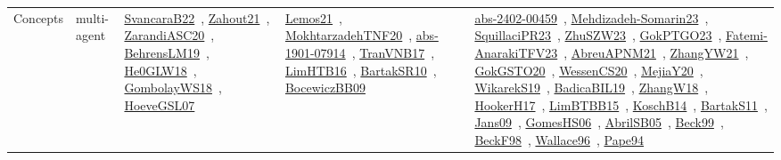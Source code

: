 {\begin{longtable}{lp{3cm}>{\raggedright\arraybackslash}p{6cm}>{\raggedright\arraybackslash}p{6cm}>{\raggedright\arraybackslash}p{8cm}}
Concepts & multi-agent & \href{../works/SvancaraB22.pdf}{SvancaraB22}~\cite{SvancaraB22}, \href{../works/Zahout21.pdf}{Zahout21}~\cite{Zahout21}, \href{../works/ZarandiASC20.pdf}{ZarandiASC20}~\cite{ZarandiASC20}, \href{../works/BehrensLM19.pdf}{BehrensLM19}~\cite{BehrensLM19}, \href{../works/He0GLW18.pdf}{He0GLW18}~\cite{He0GLW18}, \href{../works/GombolayWS18.pdf}{GombolayWS18}~\cite{GombolayWS18}, \href{../works/HoeveGSL07.pdf}{HoeveGSL07}~\cite{HoeveGSL07} & \href{../works/Lemos21.pdf}{Lemos21}~\cite{Lemos21}, \href{../works/MokhtarzadehTNF20.pdf}{MokhtarzadehTNF20}~\cite{MokhtarzadehTNF20}, \href{../works/abs-1901-07914.pdf}{abs-1901-07914}~\cite{abs-1901-07914}, \href{../works/TranVNB17.pdf}{TranVNB17}~\cite{TranVNB17}, \href{../works/LimHTB16.pdf}{LimHTB16}~\cite{LimHTB16}, \href{../works/BartakSR10.pdf}{BartakSR10}~\cite{BartakSR10}, \href{../works/BocewiczBB09.pdf}{BocewiczBB09}~\cite{BocewiczBB09} & \href{../works/abs-2402-00459.pdf}{abs-2402-00459}~\cite{abs-2402-00459}, \href{../works/Mehdizadeh-Somarin23.pdf}{Mehdizadeh-Somarin23}~\cite{Mehdizadeh-Somarin23}, \href{../works/SquillaciPR23.pdf}{SquillaciPR23}~\cite{SquillaciPR23}, \href{../works/ZhuSZW23.pdf}{ZhuSZW23}~\cite{ZhuSZW23}, \href{../works/GokPTGO23.pdf}{GokPTGO23}~\cite{GokPTGO23}, \href{../works/Fatemi-AnarakiTFV23.pdf}{Fatemi-AnarakiTFV23}~\cite{Fatemi-AnarakiTFV23}, \href{../works/AbreuAPNM21.pdf}{AbreuAPNM21}~\cite{AbreuAPNM21}, \href{../works/ZhangYW21.pdf}{ZhangYW21}~\cite{ZhangYW21}, \href{../works/GokGSTO20.pdf}{GokGSTO20}~\cite{GokGSTO20}, \href{../works/WessenCS20.pdf}{WessenCS20}~\cite{WessenCS20}, \href{../works/MejiaY20.pdf}{MejiaY20}~\cite{MejiaY20}, \href{../works/WikarekS19.pdf}{WikarekS19}~\cite{WikarekS19}, \href{../works/BadicaBIL19.pdf}{BadicaBIL19}~\cite{BadicaBIL19}, \href{../works/ZhangW18.pdf}{ZhangW18}~\cite{ZhangW18}, \href{../works/HookerH17.pdf}{HookerH17}~\cite{HookerH17}, \href{../works/LimBTBB15.pdf}{LimBTBB15}~\cite{LimBTBB15}, \href{../works/KoschB14.pdf}{KoschB14}~\cite{KoschB14}, \href{../works/BartakS11.pdf}{BartakS11}~\cite{BartakS11}, \href{../works/Jans09.pdf}{Jans09}~\cite{Jans09}, \href{../works/GomesHS06.pdf}{GomesHS06}~\cite{GomesHS06}, \href{../works/AbrilSB05.pdf}{AbrilSB05}~\cite{AbrilSB05}, \href{../works/Beck99.pdf}{Beck99}~\cite{Beck99}, \href{../works/BeckF98.pdf}{BeckF98}~\cite{BeckF98}, \href{../works/Wallace96.pdf}{Wallace96}~\cite{Wallace96}, \href{../works/Pape94.pdf}{Pape94}~\cite{Pape94}\\

\end{longtable}}
